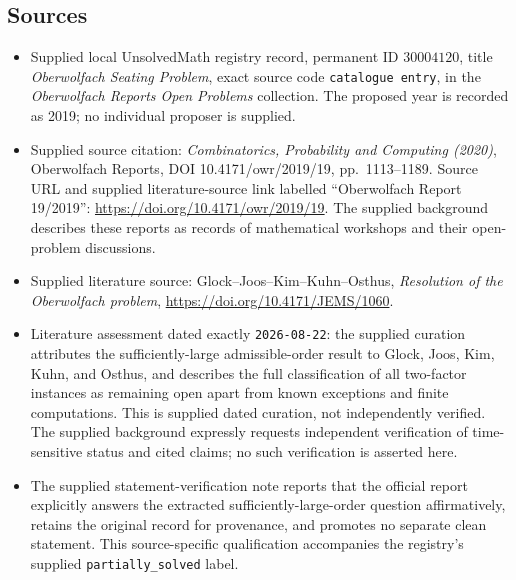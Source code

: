 \documentclass[11pt]{article}
\begin{document}
\subsection{Sources}
\begin{itemize}
\item Supplied local UnsolvedMath registry record, permanent ID \(30004120\), title \emph{Oberwolfach Seating Problem}, exact source code \texttt{catalogue entry}, in the \emph{Oberwolfach Reports Open Problems} collection. The proposed year is recorded as 2019; no individual proposer is supplied.
\item Supplied source citation: \emph{Combinatorics, Probability and Computing (2020)}, Oberwolfach Reports, DOI 10.4171/owr/2019/19, pp.~1113--1189. Source URL and supplied literature-source link labelled ``Oberwolfach Report 19/2019'': \url{https://doi.org/10.4171/owr/2019/19}. The supplied background describes these reports as records of mathematical workshops and their open-problem discussions.
\item Supplied literature source: Glock--Joos--Kim--Kuhn--Osthus, \emph{Resolution of the Oberwolfach problem}, \url{https://doi.org/10.4171/JEMS/1060}.
\item Literature assessment dated exactly \texttt{2026-08-22}: the supplied curation attributes the sufficiently-large admissible-order result to Glock, Joos, Kim, Kuhn, and Osthus, and describes the full classification of all two-factor instances as remaining open apart from known exceptions and finite computations. This is supplied dated curation, not independently verified. The supplied background expressly requests independent verification of time-sensitive status and cited claims; no such verification is asserted here.
\item The supplied statement-verification note reports that the official report explicitly answers the extracted sufficiently-large-order question affirmatively, retains the original record for provenance, and promotes no separate clean statement. This source-specific qualification accompanies the registry's supplied \texttt{partially\_solved} label.
\end{itemize}
\end{document}
